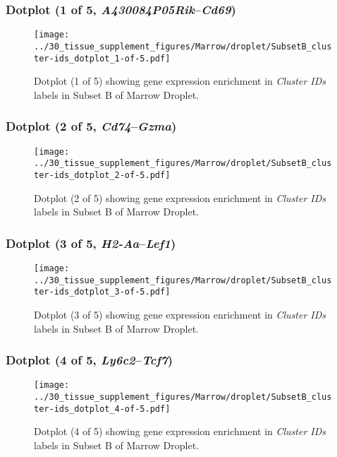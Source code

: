 \clearpage

\subsubsection{Dotplot (1 of 5, \emph{A430084P05Rik}--\emph{Cd69})}
\begin{figure}[h]
\centering
\texttt{[image: ../30\_tissue\_supplement\_figures/Marrow/droplet/SubsetB\_cluster-ids\_dotplot\_1-of-5.pdf]}

\caption{ Dotplot (1 of 5)  showing gene expression enrichment in \emph{Cluster IDs} labels in Subset B of Marrow Droplet. }
\end{figure}


\clearpage

\subsubsection{Dotplot (2 of 5, \emph{Cd74}--\emph{Gzma})}
\begin{figure}[h]
\centering
\texttt{[image: ../30\_tissue\_supplement\_figures/Marrow/droplet/SubsetB\_cluster-ids\_dotplot\_2-of-5.pdf]}

\caption{ Dotplot (2 of 5)  showing gene expression enrichment in \emph{Cluster IDs} labels in Subset B of Marrow Droplet. }
\end{figure}


\clearpage

\subsubsection{Dotplot (3 of 5, \emph{H2-Aa}--\emph{Lef1})}
\begin{figure}[h]
\centering
\texttt{[image: ../30\_tissue\_supplement\_figures/Marrow/droplet/SubsetB\_cluster-ids\_dotplot\_3-of-5.pdf]}

\caption{ Dotplot (3 of 5)  showing gene expression enrichment in \emph{Cluster IDs} labels in Subset B of Marrow Droplet. }
\end{figure}


\clearpage

\subsubsection{Dotplot (4 of 5, \emph{Ly6c2}--\emph{Tcf7})}
\begin{figure}[h]
\centering
\texttt{[image: ../30\_tissue\_supplement\_figures/Marrow/droplet/SubsetB\_cluster-ids\_dotplot\_4-of-5.pdf]}

\caption{ Dotplot (4 of 5)  showing gene expression enrichment in \emph{Cluster IDs} labels in Subset B of Marrow Droplet. }
\end{figure}


